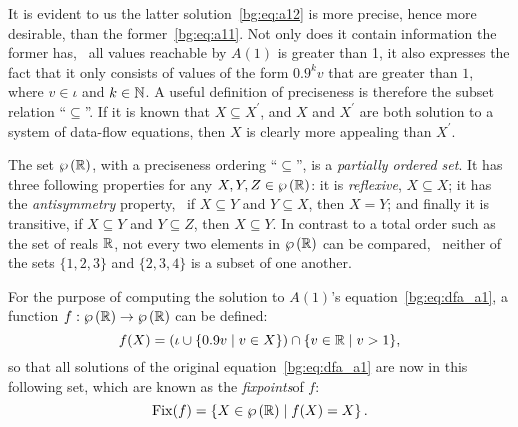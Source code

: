 It is evident to us the latter solution~\eqref{bg:eq:a12} is more precise,
hence more desirable, than the former~\eqref{bg:eq:a11}.  Not only does it
contain information the former has, \ie~all values reachable by $A(1)$ is
greater than 1, it also expresses the fact that it only consists of values
of the form $0.9^k v$ that are greater than $1$, where $v \in \iota$ and $k
\in \mathbb{N}$.  A useful definition of preciseness is therefore the subset
relation ``$\subseteq$''.  If it is known that $X \subseteq X^\prime$, and $X$
and $X^\prime$ are both solution to a system of data-flow equations, then $X$
is clearly more appealing than $X^\prime$.

The set $\wp\left({\mathbb{R}}\right)$, with a preciseness ordering ``$\subseteq$'',
is a \emph{partially ordered set}.  It has three following properties for any
$X, Y, Z \in \wp\left({\mathbb{R}}\right)$: it is \emph{reflexive}, $X \subseteq X$; it
has the \emph{antisymmetry} property, \ie~if $X \subseteq Y$ and $Y \subseteq
X$, then $X = Y$; and finally it is transitive, if $X \subseteq Y$ and $Y
\subseteq Z$, then $X \subseteq Y$.  In contrast to a total order such as the
set of reals $\mathbb{R}$, not every two elements in $\wp\left({\mathbb{R}}\right)$ can be
compared, \eg~neither of the sets $\{1, 2, 3\}$ and $\{2, 3, 4\}$ is a subset
of one another.

For the purpose of computing the solution to $A(1)$'s
equation~\eqref{bg:eq:dfa_a1}, a function $f: \wp\left({\mathbb{R}}\right) \to
\wp\left({\mathbb{R}}\right)$ can be defined:
\begin{equation}
    f(X) = \left(
        \iota \cup \left\{ 0.9 v \mid v \in X \right\}
    \right) \cap \{ v \in \mathbb{R} \mid v > 1 \},
    \label{bg:eq:a1_transfer}
\end{equation}
so that all solutions of the original equation~\eqref{bg:eq:dfa_a1} are now in
this following set, which are known as the \emph{fixpoints}\footnotemark[1] of
$f$:
\begin{equation}
    \mathrm{Fix}(f) = \left\{
        X \in \wp\left({\mathbb{R}}\right) \mid
        f(X) = X
    \right\}.
\end{equation}

